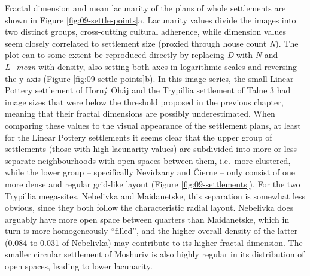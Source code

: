\documentclass[
  12pt,
  a4paper, twoside]{book}
\begin{document}
Fractal dimension and mean lacunarity of the plans of whole settlements are shown in Figure \ref{fig:09-settle-points}a. Lacunarity values divide the images into two distinct groups, cross-cutting cultural adherence, while dimension values seem closely correlated to settlement size (proxied through house count \emph{N}). The plot can to some extent be reproduced directly by replacing \emph{D} with \emph{N} and \emph{L\_mean} with density, also setting both axes in logarithmic scales and reversing the y axis (Figure \ref{fig:09-settle-points}b). In this image series, the small Linear Pottery settlement of Horný Oháj and the Trypillia settlement of Talne 3 had image sizes that were below the threshold proposed in the previous chapter, meaning that their fractal dimensions are possibly underestimated. When comparing these values to the visual appearance of the settlement plans, at least for the Linear Pottery settlements it seems clear that the upper group of settlements (those with high lacunarity values) are subdivided into more or less separate neighbourhoods with open spaces between them, i.e.~more clustered, while the lower group -- specifically Nevidzany and Čierne -- only consist of one more dense and regular grid-like layout (Figure \ref{fig:09-settlements}). For the two Trypillia mega-sites, Nebelivka and Maidanetske, this separation is somewhat less obvious, since they both follow the characteristic radial layout. Nebelivka does arguably have more open space between quarters than Maidanetske, which in turn is more homogeneously ``filled'', and the higher overall density of the latter (0.084 to 0.031 of Nebelivka) may contribute to its higher fractal dimension. The smaller circular settlement of Moshuriv is also highly regular in its distribution of open spaces, leading to lower lacunarity.
\end{document}
